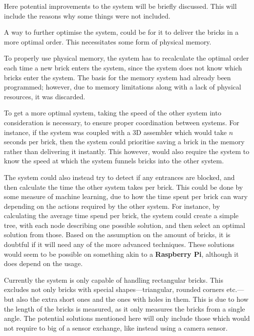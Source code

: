 Here potential improvements to the system will be briefly discussed.
This will include the reasons why some things were not included.

A way to further optimise the system, could be for it to deliver the bricks in a more optimal order. 
This necessitates some form of physical memory.

To properly use physical memory, the system has to recalculate the optimal order each time a new brick enters the system, since the system does not know which bricks enter the system.
The basis for the memory system had already been programmed; however, due to memory limitations along with a lack of physical resources, it was discarded. 

To get a more optimal system, taking the speed of the other system into consideration is necessary, to ensure proper coordination between systems.
For instance, if the system was coupled with a 3D assembler which would take $n$ seconds per brick, then the system could prioritise saving a brick in the memory rather than delivering it instantly.
This however, would also require the system to know the speed at which the system funnels bricks into the other system.

The system could also instead try to detect if any entrances are blocked, and then calculate the time the other system takes per brick.
This could be done by some measure of machine learning, due to how the time spent per brick can wary depending on the actions required by the other system.
For instance, by calculating the average time spend per brick, the system could create a simple tree, with each node describing one possible solution, and then select an optimal solution from those.
Based on the assumption on the amount of bricks, it is doubtful if it will need any of the more advanced techniques.
These solutions would seem to be possible on something akin to a \textbf{Raspberry Pi}, although it does depend on the usage. 

Currently the system is only capable of handling rectangular bricks.
This excludes not only bricks with special shapes---triangular, rounded corners etc.---but also the extra short ones and the ones with holes in them.
This is due to how the length of the bricks is measured, as it only measures the bricks from a single angle.
The potential solutions mentioned here will only include those which would not require to big of a sensor exchange, like instead using a camera sensor.

